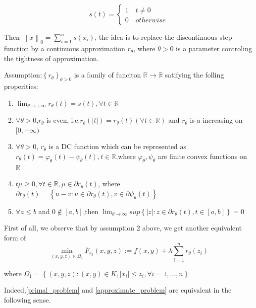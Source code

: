 \documentclass[11pt,en,bibstyle=ieeetr]{elegantpaper}
\begin{document}
\begin{equation*}
s(t) = \left\{
	\begin{array}{l}
		1\quad t \neq 0\\
		0\quad otherwise
	\end{array}\right.
\end{equation*}

Then $\left\| x \right\| _0 = \sum_{i=1}^{n}s(x_i)$, the idea is to replace the discontinuous step function by a continuous approximation $r_\theta$, where $\theta>0$ is a parameter controling the tightness of approximation.

Assumption:$\left\{ r_\theta \right\}_{\theta >0} $ is a family of funciton $\mathbb{R} \rightarrow \mathbb{R}$ satifying the folling properities: 

\begin{enumerate}
	\item $\lim_{\theta \to +\infty}r_\theta(t) = s(t),\forall t \in \mathbb{R}$  
	\item $\forall \theta>0$,$r_\theta$ is even, i.e.$r_\theta (\left| t \right| ) = r_\theta(t)(\forall t \in \mathbb{R})$ and $r_\theta$ is a increasing on $[0,+\infty)$    
	\item $ \forall \theta >0 $, $ r_\theta $ is a DC function which can be represented as $ r_\theta (t) = \varphi_\theta(t)-\psi_\theta(t), t \in \mathbb{R}$,where $ \varphi_\theta,\psi_\theta $ are finite convex functions on $ \mathbb{R} $
	\item $ t\mu \geq 0, \forall t \in \mathbb{R} , \mu \in \partial r_\theta(t)$, where $ \partial r_\theta(t) = \left\{ u-v:u \in \partial r_\theta(t) ,v \in \partial\psi_\theta(t)\right\} $  
	\item $ \forall a \leq b $ and $ 0 \not\in [a,b] $,then $ \lim_{\theta \to \infty }sup \left\{ \left| z \right| :z \in \partial r_\theta(t),t \in [a,b] \right\} = 0 $
\end{enumerate}

First of all, we observe that by assumption 2 above, we get another equivalent form of 
\begin{equation}
	\min_{(x,y,z) \in \Omega_1} \bar{F}_{r_\theta}(x,y,z) :=f(x,y)+\lambda \sum_{i=1}^{n}r_{\theta }(z_i)
\label{approximate_problem}
\end{equation}

where $ \Omega_1 = \left\{ (x,y,z):(x,y) \in K, \left| x_i \right| \leq z_i,\forall i=1,...,n\right\}  $

Indeed,\ref{primal_problem} and \ref{approximate_problem} are equivalent in the following sense.
\end{document}
